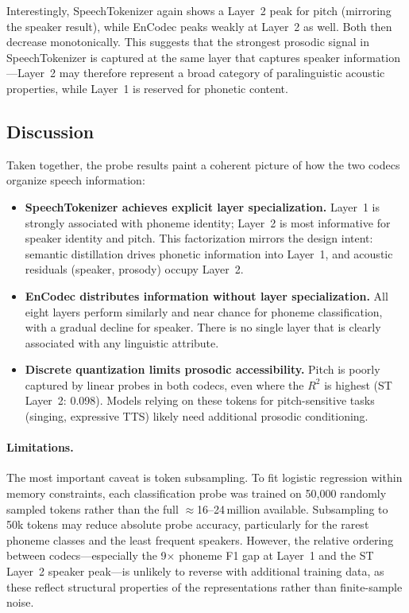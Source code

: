 \documentclass[10pt,twocolumn]{article}
\begin{document}
Interestingly, SpeechTokenizer again shows a Layer~2 peak for pitch
(mirroring the speaker result), while EnCodec peaks weakly at Layer~2
as well. Both then decrease monotonically. This suggests that the
strongest prosodic signal in SpeechTokenizer is captured at the same
layer that captures speaker information---Layer~2 may therefore
represent a broad category of paralinguistic acoustic properties,
while Layer~1 is reserved for phonetic content.

\subsection{Discussion}

Taken together, the probe results paint a coherent picture of how the
two codecs organize speech information:

\begin{itemize}
  \item \textbf{SpeechTokenizer achieves explicit layer specialization.}
        Layer~1 is strongly associated with phoneme identity; Layer~2
        is most informative for speaker identity and pitch. This
        factorization mirrors the design intent: semantic distillation
        drives phonetic information into Layer~1, and acoustic residuals
        (speaker, prosody) occupy Layer~2.

  \item \textbf{EnCodec distributes information without layer
        specialization.} All eight layers perform similarly and near
        chance for phoneme classification, with a gradual decline for
        speaker. There is no single layer that is clearly associated
        with any linguistic attribute.

  \item \textbf{Discrete quantization limits prosodic accessibility.}
        Pitch is poorly captured by linear probes in both codecs, even
        where the $R^2$ is highest (ST Layer~2: 0.098). Models relying
        on these tokens for pitch-sensitive tasks (singing, expressive
        TTS) likely need additional prosodic conditioning.
\end{itemize}

\paragraph{Limitations.}
The most important caveat is token subsampling. To fit logistic
regression within memory constraints, each classification probe was
trained on 50,000 randomly sampled tokens rather than the full
$\approx$16--24\,million available. Subsampling to 50k tokens may
reduce absolute probe accuracy, particularly for the rarest phoneme
classes and the least frequent speakers. However, the relative ordering
between codecs---especially the 9$\times$ phoneme F1 gap at Layer~1
and the ST Layer~2 speaker peak---is unlikely to reverse with
additional training data, as these reflect structural properties of the
representations rather than finite-sample noise.
\end{document}
